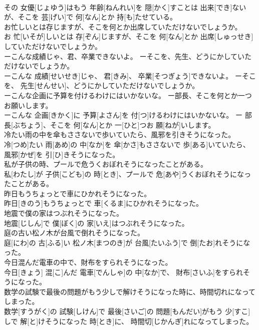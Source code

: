 \documentclass[8pt]{extreport}
\begin{document}
\begin{CJK}{UTF8}{min}
\\	その 女優[じょゆう]はもう 年齢[ねんれい]を 隠[かく]すことは 出来[でき]ないが、そこを 芸[げい]で 何[なん]とか 持[も]たせている。
\\	お忙しいとは存じますが、そこを何とか出席していただけないでしょうか。	
\\	お 忙[いそが]しいとは 存[ぞん]じますが、そこを 何[なん]とか 出席[しゅっせき]していただけないでしょうか。
\\	ーこんな成績じゃ、君、卒業できないよ。 ーそこを、先生、どうにかしていただけないでしょうか。	
\\	ーこんな 成績[せいせき]じゃ、 君[きみ]、 卒業[そつぎょう]できないよ。 ーそこを、 先生[せんせい]、どうにかしていただけないでしょうか。
\\	ーこんな企画に予算を付けるわけにはいかないな。 ー部長、そこを何とか一つお願いします。	
\\	ーこんな 企画[きかく]に 予算[よさん]を 付[つ]けるわけにはいかないな。 ー 部長[ぶちょう]、そこを 何[なん]とか 一[ひと]つお 願[ねが]いします。
\\	冷たい雨の中を傘もささないで歩いていたら、風邪を引きそうになった。	
\\	冷[つめ]たい 雨[あめ]の 中[なか]を 傘[かさ]もささないで 歩[ある]いていたら、 風邪[かぜ]を 引[ひ]きそうになった。
\\	私が子供の時、プールで危うくおぼれそうになったことがある。	
\\	私[わたし]が 子供[こども]の 時[とき]、プールで 危[あや]うくおぼれそうになったことがある。
\\	昨日もうちょっとで車にひかれそうになった。	
\\	昨日[きのう]もうちょっとで 車[くるま]にひかれそうになった。
\\	地震で僕の家はつぶれそうになった。	
\\	地震[じしん]で 僕[ぼく]の 家[いえ]はつぶれそうになった。
\\	庭の古い松ノ木が台風で倒れそうになった。	
\\	庭[にわ]の 古[ふる]い 松ノ木[まつのき]が 台風[たいふう]で 倒[たお]れそうになった。
\\	今日混んだ電車の中で、財布をすられそうになった。	
\\	今日[きょう] 混[こ]んだ 電車[でんしゃ]の 中[なか]で、 財布[さいふ]をすられそうになった。
\\	数学の試験で最後の問題がもう少しで解けそうになった時に、時間切れになってしまった。	
\\	数学[すうがく]の 試験[しけん]で 最後[さいご]の 問題[もんだい]がもう 少[すこ]しで 解[と]けそうになった 時[とき]に、 時間切[じかんぎ]れになってしまった。

\end{CJK}
\end{document}
